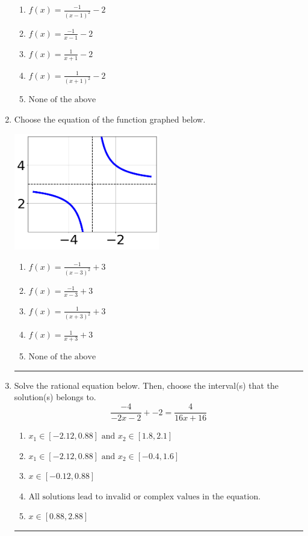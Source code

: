 \documentclass[14pt]{extbook}
\newcommand{\litem}[1]{\item#1\hspace*{-1cm}\rule{\textwidth}{0.4pt}}
\begin{document}
\begin{enumerate}
{\begin{center}
\end{center}
\begin{enumerate}[label=\Alph*.]
\item \( f(x) = \frac{-1}{(x - 1)^2} - 2 \)
\item \( f(x) = \frac{-1}{x - 1} - 2 \)
\item \( f(x) = \frac{1}{x + 1} - 2 \)
\item \( f(x) = \frac{1}{(x + 1)^2} - 2 \)
\item \( \text{None of the above} \)

\end{enumerate} }
\litem{
Choose the equation of the function graphed below.
\begin{center}
    \includegraphics[width=0.5\textwidth]{../Figures/rationalGraphToEquationCopyC.png}
\end{center}
\begin{enumerate}[label=\Alph*.]
\item \( f(x) = \frac{-1}{(x - 3)^2} + 3 \)
\item \( f(x) = \frac{-1}{x - 3} + 3 \)
\item \( f(x) = \frac{1}{(x + 3)^2} + 3 \)
\item \( f(x) = \frac{1}{x + 3} + 3 \)
\item \( \text{None of the above} \)

\end{enumerate} }
\litem{
Solve the rational equation below. Then, choose the interval(s) that the solution(s) belongs to.\[ \frac{-4}{-2x -2} + -2 = \frac{4}{16x + 16} \]\begin{enumerate}[label=\Alph*.]
\item \( x_1 \in [-2.12, 0.88] \text{ and } x_2 \in [1.8,2.1] \)
\item \( x_1 \in [-2.12, 0.88] \text{ and } x_2 \in [-0.4,1.6] \)
\item \( x \in [-0.12,0.88] \)
\item \( \text{All solutions lead to invalid or complex values in the equation.} \)
\item \( x \in [0.88,2.88] \)


\end{enumerate}}
\end{enumerate}
\end{document}
